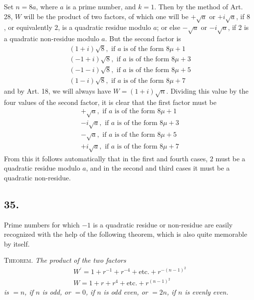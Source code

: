 \documentclass[twoside,12pt]{memoir}
\begin{document}
Set \(n=8a\), where \(a\) is a prime number, and \(k=1\). Then by the method of Art. 28, \(W\) will be the product of two factors, of which one will be \(+\sqrt{a}\) or \(+i\sqrt{a}\), if \(8\), or equivalently \(2\), is a quadratic residue modulo \(a\); or else \(-\sqrt{a}\) or \(-i\sqrt{a}\), if 2 is a quadratic non-residue modulo \(a\). But the second factor is 
\[\begin{aligned}
& (1+i)\sqrt{8}, \text{ if } a \text{ is of the form } 8\mu+1 \\
& (-1+i)\sqrt{8}, \text{ if } a \text{ is of the form } 8\mu+3 \\
& (-1-i)\sqrt{8}, \text{ if } a \text{ is of the form } 8\mu+5 \\
& (1-i)\sqrt{8}, \text{ if } a \text{ is of the form } 8\mu+7
\end{aligned}\]
and by Art. 18, we will always have \(W=(1+i)\sqrt{n}\). Dividing this value by the four values of the second factor, it is clear that the first factor must be
\[\begin{aligned}
& +\sqrt{a}, \text{ if } a \text{ is of the form } 8\mu+1 \\
& -i\sqrt{a}, \text{ if } a \text{ is of the form } 8\mu+3 \\
& -\sqrt{a}, \text{ if } a \text{ is of the form } 8\mu+5 \\
& +i\sqrt{a}, \text{ if } a \text{ is of the form } 8\mu+7
\end{aligned}\]
From this it follows automatically that in the first and fourth cases, \(2\) must be a quadratic residue modulo \(a\), and in the second and third cases it must be a quadratic non-residue.
%

\subsection*{35.}

Prime numbers for which \(-1\) is a quadratic residue or non-residue are easily recognized with the help of the following theorem, which is also quite memorable by itself.

\textsc{Theorem.} \textit{The product of the two factors}
\[\begin{aligned}
& W^{\prime}=1+r^{-1}+r^{-4}+\text{etc{.}}+r^{-(n-1)^{2}} \\
& W=1+r+r^{4}+\text{etc{.}}+r^{(n-1)^{2}}
\end{aligned}\]
\textit{is \(=n\), if \(n\) is odd, or \(=0\), if \(n\) is odd even, or \(=2 n\), if \(n\) is evenly even.}
\end{document}
